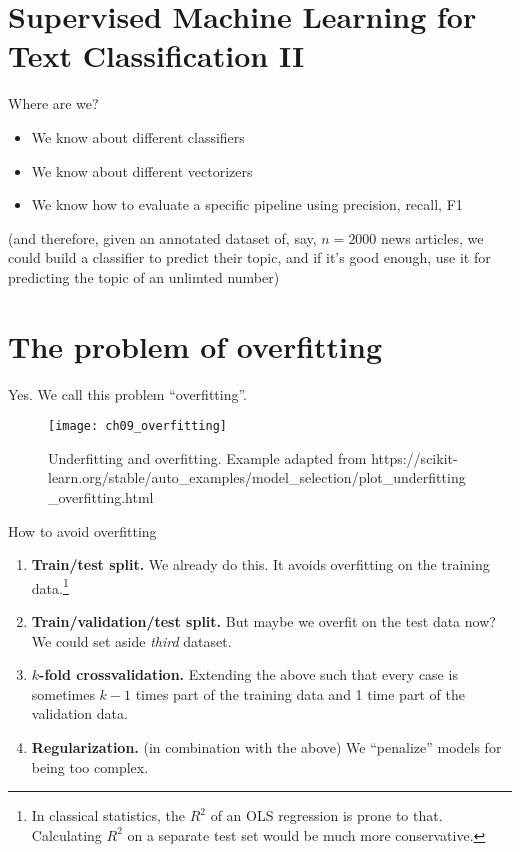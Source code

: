 \section{Supervised Machine Learning for Text Classification II}

\begin{frame}{Where are we?}
  \begin{itemize}
  \item We know about different classifiers
  \item We know about different vectorizers
  \item We know how to evaluate a specific pipeline using precision, recall, F1
  \end{itemize}
(and therefore, given an annotated dataset of, say, $n=2000$ news articles, we could build a classifier to predict their topic, and if it's good enough, use it for predicting the topic of an unlimted number)
\end{frame}


\section{The problem of overfitting}




\begin{frame}{Yes. We call this problem ``overfitting''.}

\begin{figure}
	\centering
	\texttt{[image: ch09\_overfitting]}
	\caption{Underfitting and overfitting. Example adapted from https://scikit-learn.org/stable/auto\_examples/model\_selection/plot\_underfitting\_overfitting.html}
	\label{fig:overfit}
\end{figure}
\end{frame}


\begin{frame}{How to avoid overfitting}
\begin{enumerate}[<+->]
	\item \textbf{Train/test split. } We already do this. It avoids overfitting on the training data.\footnote{In classical statistics, the $R^2$ of an OLS regression is prone to that. Calculating $R^2$ on a separate test set would be much more conservative.}
	\item \textbf{Train/validation/test split.} But maybe we overfit on the test data now? We could set aside \textit{third} dataset.
	\item \textbf{$k$-fold crossvalidation.} Extending the above such that every case is sometimes $k-1$ times part of the training data and 1 time part of the validation data.
	\item \textbf{Regularization.} (in combination with the above) We ``penalize'' models for being too complex.
\end{enumerate}

\end{frame}



